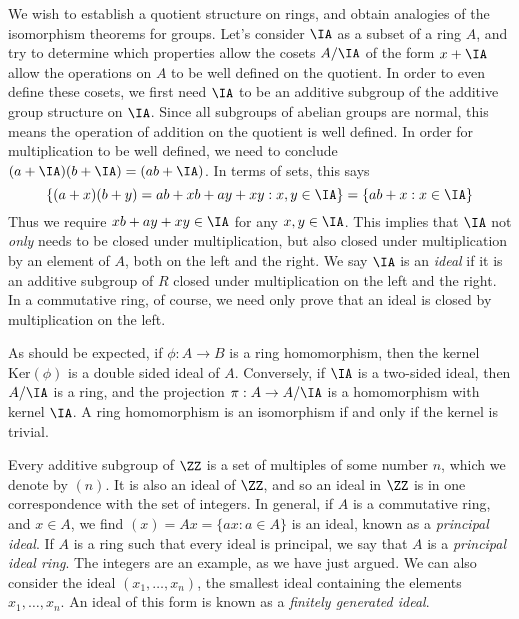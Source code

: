 We wish to establish a quotient structure on rings, and obtain analogies of the isomorphism theorems for groups. Let's consider $\IA$ as a subset of a ring $A$, and try to determine which properties allow the cosets $A/\IA$ of the form $x + \IA$ allow the operations on $A$ to be well defined on the quotient. In order to even define these cosets, we first need $\IA$ to be an additive subgroup of the additive group structure on $\IA$. Since all subgroups of abelian groups are normal, this means the operation of addition on the quotient is well defined. In order for multiplication to be well defined, we need to conclude $(a + \IA)(b + \IA) = (ab + \IA)$. In terms of sets, this says
%
\[ \{ (a + x)(b + y) = ab + xb + ay + xy : x,y \in \IA \} = \{ ab + x : x \in \IA \} \]
%
Thus we require $xb + ay + xy \in \IA$ for any $x,y \in \IA$. This implies that $\IA$ not {\it only} needs to be closed under multiplication, but also closed under multiplication by an element of $A$, both on the left and the right. We say $\IA$ is an \emph{ideal} if it is an additive subgroup of $R$ closed under multiplication on the left and the right. In a commutative ring, of course, we need only prove that an ideal is closed by multiplication on the left.

\begin{example}
    As should be expected, if $\phi: A \to B$ is a ring homomorphism, then the kernel $\text{Ker}(\phi)$ is a double sided ideal of $A$. Conversely, if $\IA$ is a two-sided ideal, then $A/\IA$ is a ring, and the projection $\pi: A \to A/\IA$ is a homomorphism with kernel $\IA$.  A ring homomorphism is an isomorphism if and only if the kernel is trivial.
\end{example}

\begin{example}
    Every additive subgroup of $\ZZ$ is a set of multiples of some number $n$, which we denote by $(n)$. It is also an ideal of $\ZZ$, and so an ideal in $\ZZ$ is in one correspondence with the set of integers. In general, if $A$ is a commutative ring, and $x \in A$, we find $(x) = Ax = \{ ax: a \in A \}$ is an ideal, known as a \emph{principal ideal}. If $A$ is a ring such that every ideal is principal, we say that $A$ is a \emph{principal ideal ring}. The integers are an example, as we have just argued. We can also consider the ideal $(x_1, \dots, x_n)$, the smallest ideal containing the elements $x_1, \dots, x_n$. An ideal of this form is known as a \emph{finitely generated ideal}.
\end{example}

